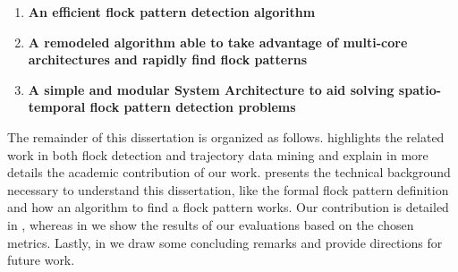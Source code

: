 \begin{enumerate}
    \item \textbf{An efficient flock pattern detection algorithm}
    \item \textbf{A remodeled algorithm able to take advantage of multi-core architectures and rapidly find flock
        patterns}
    \item \textbf{A simple and modular System Architecture to aid solving spatio-temporal flock pattern detection problems}
\end{enumerate}

The remainder of this dissertation is organized as follows.  highlights the related work in
both flock detection and trajectory data mining and explain in more details the academic contribution of our work.
 presents the technical background necessary to understand this dissertation, like the
formal flock pattern definition and how an algorithm to find a flock pattern works. Our contribution is detailed in
, whereas in  we show the results of our evaluations based on the chosen
metrics. Lastly, in  we draw some concluding remarks and provide directions for future work.
